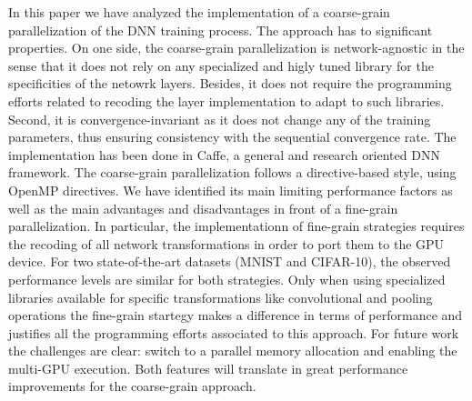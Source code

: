 In this paper we have analyzed the implementation of a coarse-grain 
parallelization of the DNN training process. The approach has to 
significant properties. On one side, the coarse-grain parallelization 
is network-agnostic in the sense that it does not rely on any 
specialized and higly tuned library for the specificities of the 
netowrk layers. Besides, it does not require the programming efforts 
related to recoding the layer implementation to adapt to such libraries. 
Second, it is convergence-invariant as it does not change any of the 
training parameters, thus ensuring consistency with the sequential 
convergence rate.  The implementation has 
been done in Caffe, a general and research oriented DNN framework. 
The coarse-grain parallelization follows a directive-based style, 
using OpenMP directives. We have identified its main 
limiting performance factors as well as the main advantages and 
disadvantages in front of a fine-grain parallelization.
In particular, the implementationn of fine-grain strategies requires
the recoding of all network transformations in order to port them 
to the GPU device. For two state-of-the-art datasets (MNIST and CIFAR-10), 
the observed performance levels are similar for both strategies. 
Only when using specialized libraries available for specific transformations 
like convolutional and pooling operations the fine-grain startegy makes a 
difference in terms of performance and justifies all the programming efforts 
associated to this approach.
For future work the challenges are clear: switch to a parallel memory allocation and enabling the multi-GPU execution. Both features will translate in great performance improvements for the coarse-grain approach.
